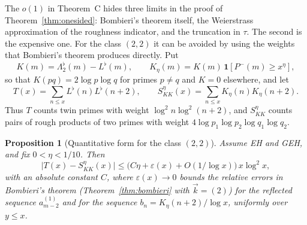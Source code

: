 \documentclass[11pt]{amsart}
\newtheorem{proposition}[theorem]{Proposition}
\theoremstyle{definition}
\theoremstyle{remark}
\newcommand{\Lflat}{\Lambda_2^{\flat}}
\begin{document}
The $o(1)$ in Theorem~C hides three limits in the proof of Theorem~\ref{thm:onesided}: Bombieri's theorem itself, the Weierstrass approximation of the roughness indicator, and the truncation in $\tau$. The second is the expensive one. For the class $(2,2)$ it can be avoided by using the weights that Bombieri's theorem produces directly. Put
\[
K(m)=\Lflat(m)-L^\flat(m),\qquad K_\eta(m)=K(m)\,\mathbf 1[P^-(m)\ge x^\eta],
\]
so that $K(pq)=2\log p\log q$ for primes $p\ne q$ and $K=0$ elsewhere, and let
\[
T(x)=\sum_{n\le x}L^\flat(n)L^\flat(n+2),\qquad S^\eta_{KK}(x)=\sum_{n\le x}K_\eta(n)K_\eta(n+2).
\]
Thus $T$ counts twin primes with weight $\log^2n\log^2(n+2)$, and $S^\eta_{KK}$ counts pairs of rough products of two primes with weight $4\log p_1\log p_2\log q_1\log q_2$.

\begin{proposition}[Quantitative form for the class $(2,2)$]\label{prop:Q}
Assume EH and GEH, and fix $0<\eta<1/10$. Then
\[
\bigl|T(x)-S^\eta_{KK}(x)\bigr|\le\bigl(C\eta+\varepsilon(x)+O(1/\log x)\bigr)\,x\log^2x,
\]
with an absolute constant $C$, where $\varepsilon(x)\to0$ bounds the relative errors in Bombieri's theorem (Theorem~\ref{thm:bombieri} with $\vec k=(2)$) for the reflected sequence $a^{(1)}_{m-2}$ and for the sequence $b_n=K_\eta(n+2)/\log x$, uniformly over $y\le x$.
\end{proposition}
\end{document}

